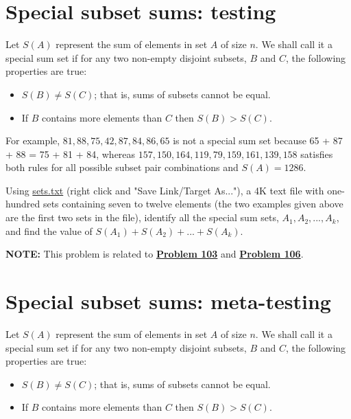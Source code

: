 \newpage


\section{Special subset sums: testing} \label{pb.0105}

Let $S(A)$ represent the sum of elements in set $A$ of size $n$. We shall call it a special sum set if for any two non-empty disjoint subsets, $B$ and $C$, the following properties are true:
\medskip

\begin{itemize}
    \item $S(B) \neq S(C)$; that is, sums of subsets cannot be equal.
    \item If $B$ contains more elements than $C$ then $S(B) > S(C)$.
\end{itemize}
\medskip

For example, ${81, 88, 75, 42, 87, 84, 86, 65}$ is not a special sum set because 65 + 87 + 88 = 75 + 81 + 84, whereas ${157, 150, 164, 119, 79, 159, 161, 139, 158}$ satisfies both rules for all possible subset pair combinations and $S(A) = 1286$.

Using \href{https://projecteuler.net/project/resources/p105_sets.txt}{sets.txt} (right click and "Save Link/Target As..."), a 4K text file with one-hundred sets containing seven to twelve elements (the two examples given above are the first two sets in the file), identify all the special sum sets, $A_1, A_2, ..., A_k$, and find the value of $S(A_1) + S(A_2) + ... + S(A_k)$.

\textbf{NOTE:} This problem is related to \hyperref[pb.0103]{\textbf{Problem 103}} and \hyperref[pb.0106]{\textbf{Problem 106}}.


\section{Special subset sums: meta-testing} \label{pb.0106}

Let $S(A)$ represent the sum of elements in set $A$ of size $n$. We shall call it a special sum set if for any two non-empty disjoint subsets, $B$ and $C$, the following properties are true:
\medskip

\begin{itemize}
    \item $S(B) \neq S(C)$; that is, sums of subsets cannot be equal.
    \item If $B$ contains more elements than $C$ then $S(B) > S(C)$.
\end{itemize}
\medskip

